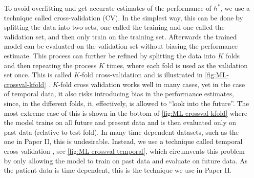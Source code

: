 To avoid overfitting and get accurate estimates of the performance of $h^*$, we use a technique called cross-validation (CV). In the simplest way, this can be done by splitting the data into two sets, one called the training and one called the validation set, and then only train on the training set. Afterwards the trained model can be evaluated on the validation set without biasing the performance estimate. This process can further be refined by splitting the data into $K$ folds and then repeating the process $K$ times, where each fold is used as the validation set once.
This is called $K$-fold cross-validation and is illustrated in \autoref{fig:ML-crossval-kfold} \autocite{murphyMachineLearningProbabilistic2012,hastieElementsStatisticalLearning2016}.
$K$-fold cross validation works well in many cases, yet in the case of temporal data, it also risks introducing bias in the performance estimates, since, in the different folds, it, effectively, is allowed to ``look into the future''. The most extreme case of this is shown in the bottom of \autoref{fig:ML-crossval-kfold} where the model trains on all future and present data and is then evaluated only on past data (relative to test fold). In many time dependent datasets, such as the one in Paper II, this is undesirable. Instead, we use a technique called temporal cross validation \autocite{tashmanOutofsampleTestsForecasting2000a}, see \autoref{fig:ML-crossval-temporal}, which circumvents this problem by only allowing the model to train on past data and evaluate on future data. As the patient data is time dependent, this is the technique we use in Paper II.

